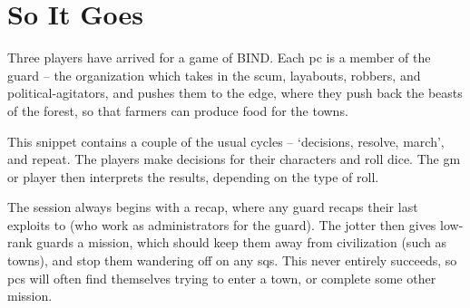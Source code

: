 \section[Example of Play]{So It Goes}

\begin{multicols}{2}

\noindent
Three players have arrived for a game of BIND.
Each \gls{pc} is a member of the \gls{guard} -- the organization which takes in the scum, layabouts, robbers, and political-agitators, and pushes them to the \gls{edge}, where they push back the beasts of the forest, so that farmers can produce food for the towns.

This snippet contains a couple of the usual cycles -- `decisions, resolve, march', and repeat.
The players make decisions for their characters and roll dice.
The \gls{gm} or player then interprets the results, depending on the type of roll.

The session always begins with a recap, where any \gls{guard} recaps their last exploits to  (who work as administrators for the \gls{guard}).
The \gls{jotter} then gives low-rank \glspl{guard} a mission, which should keep them away from civilization (such as towns), and stop them wandering off on any \glspl{sq}.
This never entirely succeeds, so \glspl{pc} will often find themselves trying to enter a town, or complete some other mission.

\end{multicols}
